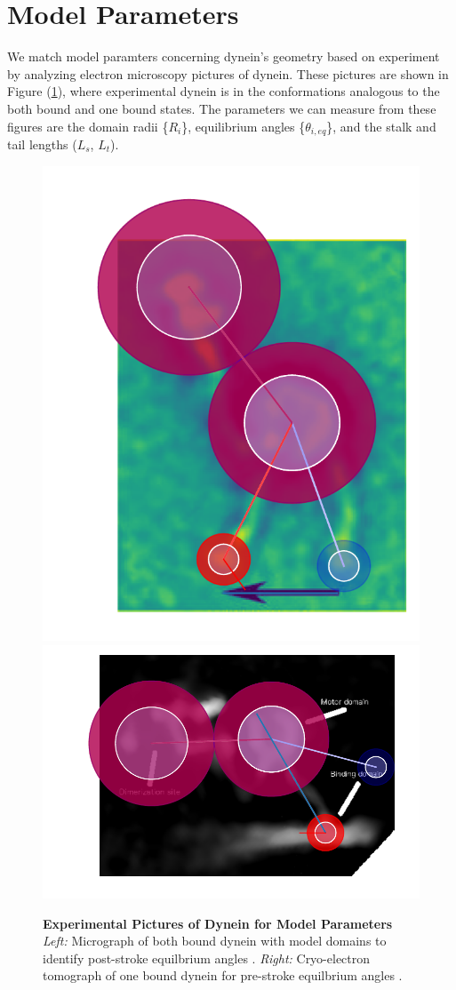 \section{Model Parameters}

We match model paramters concerning dynein's geometry based on experiment by analyzing electron microscopy pictures of dynein. These pictures are shown in Figure (\ref{fig:ParamsPics}), where experimental dynein is in the conformations analogous to the both bound and one bound states. The parameters we can measure from these figures are the domain radii \{$R_i$\}, equilibrium angles \{$\theta_{i,eq}$\}, and the stalk and tail lengths ($L_s$, $L_t$).  

\begin{figure}[hbt!]
	\centering
	\includegraphics[width=0.3\columnwidth]{../../plots/burgess-model-figure.pdf}
	\includegraphics[width=0.5\columnwidth]{../../plots/grotjahn-model-figure.pdf}%
	\caption[Experimental Pictures of Dynein for Model Parameters]{\textbf{Experimental Pictures of Dynein for Model Parameters} \textit{Left:} Micrograph of both bound dynein with model domains to identify post-stroke equilbrium angles \cite{Burgess2003}.  \textit{Right:} Cryo-electron tomograph of one bound dynein for pre-stroke equilbrium angles \cite{grotjahn2018cryo}.} 
	\label{fig:ParamsPics}
\end{figure}

